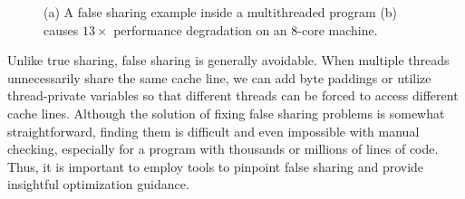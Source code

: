 \begin{figure}[htbp]
\centering
{}%
\hspace{20pt}
\caption{
(a) A false sharing example inside a multithreaded program (b) causes $13\times$ performance degradation on an 8-core machine.
\label{fig:penalty}}
\end{figure}


Unlike true sharing, false sharing is generally avoidable. When multiple threads unnecessarily share the same cache line, we can add byte paddings or utilize thread-private variables so that different threads can be forced to access different cache lines. Although the solution of fixing false sharing problems is somewhat straightforward, finding them is difficult and even impossible with manual checking, especially for a program with thousands or millions of lines of code. Thus, it is important to employ tools to pinpoint false sharing and provide insightful optimization guidance.

